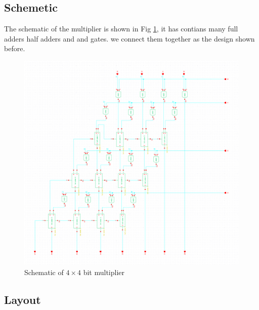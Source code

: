 \documentclass[conference]{IEEEtran}
\begin{document}

\subsection{Schemetic}

The schematic of the multiplier is shown in Fig \ref{4X4_Multiplier_schematic}, it has contians many full adders half adders and and gates. we connect them together as the design shown before.

\begin{figure}[H]
    \centering
    \includegraphics[width=0.9\linewidth]{4X4_Multiplier_schematic.png}
    \caption{Schematic of $4 \times 4$ bit multiplier}
    \label{4X4_Multiplier_schematic}
\end{figure}

\subsection{Layout}
\end{document}

